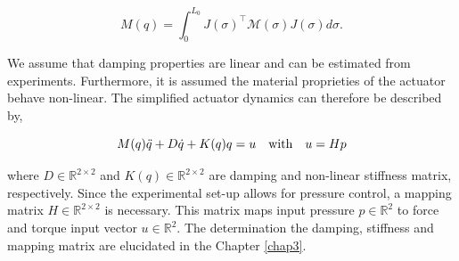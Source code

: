 \begin{equation}
    M(q) = \int_0^{L_0} J(\sigma)^\top \mathcal{M}(\sigma)J(\sigma) d \sigma.
\end{equation}


We assume that damping properties are linear and can be estimated from experiments. Furthermore, it is assumed the material proprieties of the actuator behave non-linear. The simplified actuator dynamics can therefore be described by,

\begin{equation}
    M(q)\Ddot{q} + D\dot{q} + K(q)q = u \hspace{10pt} \text{with} \hspace{10pt} u = Hp
\end{equation}

where $D \in \mathbb{R}^{2 \times 2}$ and $K(q) \in \mathbb{R}^{2 \times 2}$ are damping and non-linear stiffness matrix, respectively. Since the experimental set-up allows for pressure control, a mapping matrix $H \in \mathbb{R}^{2\times2}$ is necessary. This matrix maps input pressure $p \in \mathbb{R}^2$ to force and torque input vector $u \in \mathbb{R}^2$. The determination the damping, stiffness and mapping matrix are elucidated in the Chapter \ref{chap3}.


